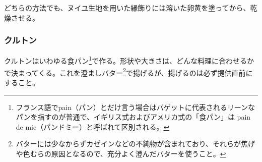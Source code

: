 \begin{recette}
どちらの方法でも、ヌイユ生地を用いた縁飾りには溶いた卵黄を塗ってから、乾燥させる。

\atoaki{}

\hypertarget{croutons}{%
\subsubsection{クルトン}\label{croutons}}


 

クルトンはいわゆる食パン\footnote{フランス語でpain（パン）とだけ言う場合はバゲットに代表されるリーンなパンを指すのが普通で、イギリス式およびアメリカ式の「食パン」は
  pain de mie（パンドミー）と呼ばれて区別される。}で作る。形状や大きさは、どんな料理に合わせるかで決まってくる。これを澄ましバター\footnote{バターには少なからずカゼインなどの不純物が含まれており、それらが焦げや色むらの原因となるので、充分よく澄んだバターを使うこと。}で揚げるが、揚げるのは必ず提供直前にすること。

\atoaki{}

\hypertarget{duxelles-seche}{%
}
\end{recette}
